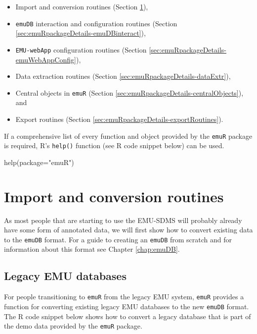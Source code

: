 \documentclass[
]{book}
\newenvironment{Shaded}{\begin{snugshade}}{\end{snugshade}}
\newcommand{\AttributeTok}[1]{\textcolor[rgb]{0.77,0.63,0.00}{#1}}
\newcommand{\FunctionTok}[1]{\textcolor[rgb]{0.00,0.00,0.00}{#1}}
\newcommand{\NormalTok}[1]{#1}
\newcommand{\StringTok}[1]{\textcolor[rgb]{0.31,0.60,0.02}{#1}}
\providecommand{\tightlist}{%
  \setlength{\itemsep}{0pt}\setlength{\parskip}{0pt}}
\begin{document}
\begin{itemize}
\tightlist
\item
  Import and conversion routines (Section \ref{sec:emuRpackageDetails-importRoutines}),
\item
  \texttt{emuDB} interaction and configuration routines (Section \ref{sec:emuRpackageDetails-emuDBinteract}),
\item
  \texttt{EMU-webApp} configuration routines (Section \ref{sec:emuRpackageDetails-emuWebAppConfig}),
\item
  Data extraction routines (Section \ref{sec:emuRpackageDetails-dataExtr}),
\item
  Central objects in \texttt{emuR} (Section \ref{sec:emuRpackageDetails-centralObjects}), and
\item
  Export routines (Section \ref{sec:emuRpackageDetails-exportRoutines}).
\end{itemize}

If a comprehensive list of every function and object provided by the \texttt{emuR} package is required, R's \texttt{help()} function (see R code snippet below) can be used.

\begin{Shaded}
\begin{Highlighting}[]
\FunctionTok{help}\NormalTok{(}\AttributeTok{package=}\StringTok{"emuR"}\NormalTok{)}
\end{Highlighting}
\end{Shaded}

\hypertarget{sec:emuRpackageDetails-importRoutines}{%
\section{Import and conversion routines}\label{sec:emuRpackageDetails-importRoutines}}

As most people that are starting to use the EMU-SDMS will probably already have some form of annotated data, we will first show how to convert existing data to the \texttt{emuDB} format. For a guide to creating an \texttt{emuDB} from scratch and for information about this format see Chapter \ref{chap:emuDB}.

\hypertarget{legacy-emu-databases}{%
\subsection{Legacy EMU databases}\label{legacy-emu-databases}}

For people transitioning to \texttt{emuR} from the legacy EMU system, \texttt{emuR} provides a function for converting existing legacy EMU databases to the new \texttt{emuDB} format. The R code snippet below shows how to convert a legacy database that is part of the demo data provided by the \texttt{emuR} package.
\end{document}
